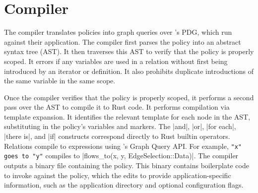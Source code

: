 \section{Compiler}

The \syslang{} compiler translates policies into graph queries over \sys{}'s PDG,
which \devs{} run against their application.
%
The compiler first parses the policy into an abstract syntax tree (AST).
%
It then traverses this AST to verify that the policy is properly scoped.
%
It errors if any variables are used in a relation without first being introduced by an iterator or definition.
%
It also prohibits duplicate introductions of the same variable in the same scope.

Once the compiler verifies that the policy is properly scoped,
it performs a second pass over the AST to compile it to Rust code.
%
It performs compilation via template expansion.
%
It identifies the relevant template for each node in the AST,
substituting in the policy's variables and markers.
%
The |and|, |or|, |for each|, |there is|, and |if| constructs correspond directly to Rust builtin operators.
%
Relations compile to expressions using \sys{}'s Graph Query API.
%
For example, \lstinline[language=CNL]|"x" goes to "y"| compiles to |flows_to(x, y, EdgeSelection::Data)|.
%
The compiler outputs a binary file containing the policy.
%
This binary contains boilerplate code to invoke \sys{} against the policy,
which the \dev{} edits to provide application-specific information,
such as the application directory
and optional \sys{} configuration flags.
%
